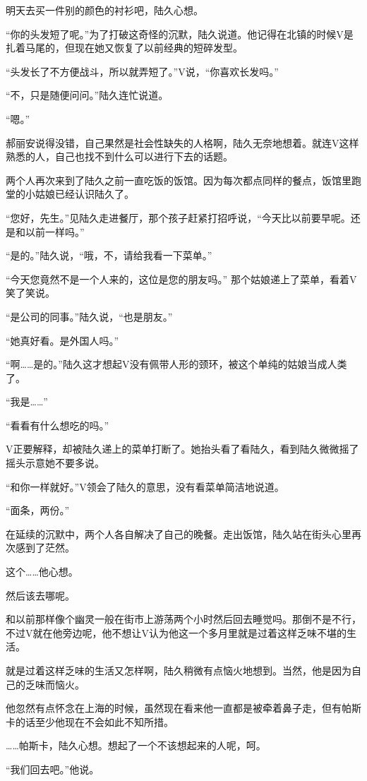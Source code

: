 明天去买一件别的颜色的衬衫吧，陆久心想。

“你的头发短了呢。”为了打破这奇怪的沉默，陆久说道。他记得在北镇的时候V是扎着马尾的，但现在她又恢复了以前经典的短碎发型。

“头发长了不方便战斗，所以就弄短了。”V说，“你喜欢长发吗。”

“不，只是随便问问。”陆久连忙说道。

“嗯。”

郝丽安说得没错，自己果然是社会性缺失的人格啊，陆久无奈地想着。就连V这样熟悉的人，自己也找不到什么可以进行下去的话题。

两个人再次来到了陆久之前一直吃饭的饭馆。因为每次都点同样的餐点，饭馆里跑堂的小姑娘已经认识陆久了。

“您好，先生。”见陆久走进餐厅，那个孩子赶紧打招呼说，“今天比以前要早呢。还是和以前一样吗。”

“是的。”陆久说，“哦，不，请给我看一下菜单。”

“今天您竟然不是一个人来的，这位是您的朋友吗。” 那个姑娘递上了菜单，看着V笑了笑说。

“是公司的同事。”陆久说，“也是朋友。”

“她真好看。是外国人吗。”

“啊……是的。”陆久这才想起V没有佩带人形的颈环，被这个单纯的姑娘当成人类了。

“我是……”

“看看有什么想吃的吗。”

V正要解释，却被陆久递上的菜单打断了。她抬头看了看陆久，看到陆久微微摇了摇头示意她不要多说。

“和你一样就好。”V领会了陆久的意思，没有看菜单简洁地说道。

“面条，两份。”

在延续的沉默中，两个人各自解决了自己的晚餐。走出饭馆，陆久站在街头心里再次感到了茫然。

这个……他心想。

然后该去哪呢。

和以前那样像个幽灵一般在街市上游荡两个小时然后回去睡觉吗。那倒不是不行，不过V就在他旁边呢，他不想让V认为他这一个多月里就是过着这样乏味不堪的生活。

就是过着这样乏味的生活又怎样啊，陆久稍微有点恼火地想到。当然，他是因为自己的乏味而恼火。

他忽然有点怀念在上海的时候，虽然现在看来他一直都是被牵着鼻子走，但有帕斯卡的话至少他现在不会如此不知所措。

……帕斯卡，陆久心想。想起了一个不该想起来的人呢，呵。

“我们回去吧。”他说。

